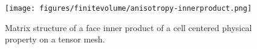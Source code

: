 \begin{figure}[ht]
    \centering
    \texttt{[image: figures/finitevolume/anisotropy-innerproduct.png]}
    \caption{Matrix structure of a face inner product of a cell centered physical property on a tensor mesh.}
    \label{fig:finitevolume-anisotropy-innerproduct}
\end{figure}
